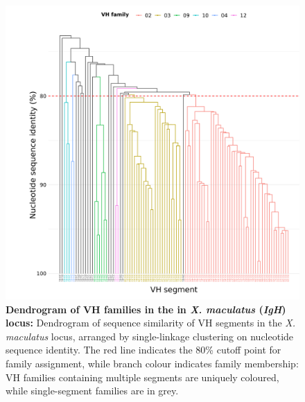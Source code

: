 	
	\begin{figure}
	\centering
	\includegraphics[width=\textwidth]{_Figures/png/xma-vh-families-tree}
	\caption[Dendrogram of VH families in the in \textit{X. maculatus} \textit{IgH} locus]{\textbf{Dendrogram of VH families in the in \textit{X. maculatus} (\textit{IgH}) locus:} Dendrogram of sequence similarity of VH segments in the \textit{X. maculatus} locus, arranged by single-linkage clustering on nucleotide sequence identity. The red line indicates the 80\% cutoff point for family assignment, while branch colour indicates family membership:  VH families containing multiple segments are uniquely coloured, while single-segment families are in grey.}
	\label{fig:xma-vh-families-tree}
	\end{figure}
	
